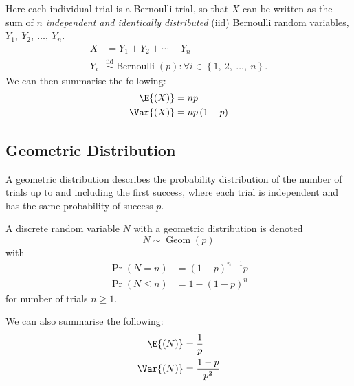 \documentclass{article}
\begin{document}
\begin{multicols}{3}
    Here each individual trial is a Bernoulli trial, so that \(X\) can be written as the sum of
    \(n\) \textit{independent and identically distributed} (iid) Bernoulli random variables, \(Y_1,\: Y_2,\: \dots,\: Y_n\).
    \begin{align*}
        X & = Y_1 + Y_2 + \cdots + Y_n \\
        Y_i & \overset{\mathrm{iid}}{\sim} \operatorname{Bernoulli}{\left( p \right)} : \forall i \in \left\{ 1,\: 2,\: \dots,\: n \right\}.
    \end{align*}
    We can then summarise the following:
    \begin{align*}
        \E{\left( X \right)}   & = np                      \\
        \Var{\left( X \right)} & = np \left( 1 - p \right)
    \end{align*}
    \subsection{Geometric Distribution}
    A geometric distribution describes the probability distribution of the number of trials up to and including
    the first success, where each trial is independent and has the same probability of success \(p\).

    A discrete random variable \(N\) with a geometric distribution is denoted
    \begin{equation*}
        N \sim \operatorname{Geom}{\left( p \right)}
    \end{equation*}
    with
    \begin{align*}
        \Pr{\left( N = n \right)}    & = \left( 1 - p \right)^{n - 1} p \\
        \Pr{\left( N \leq n \right)} & = 1 - \left( 1 - p \right)^n
    \end{align*}
    for number of trials \(n \geq 1\).

    We can also summarise the following:
    \begin{align*}
        \E{\left( N \right)}   & = \frac{1}{p}       \\
        \Var{\left( N \right)} & = \frac{1 - p}{p^2}
    \end{align*}

\end{multicols}
\end{document}
